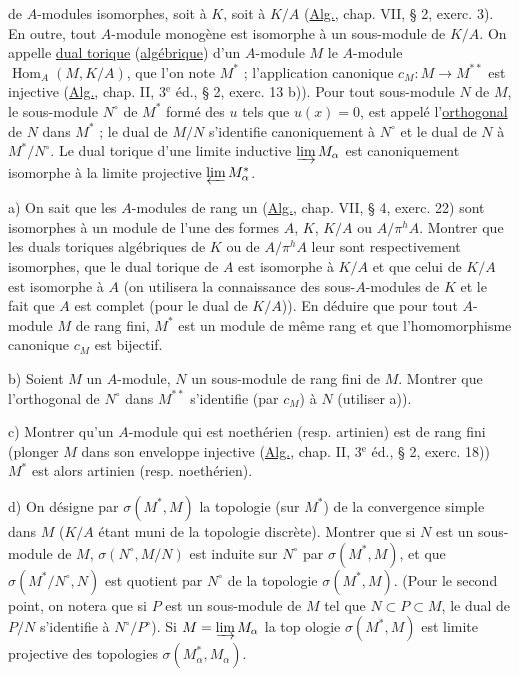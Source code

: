 de $A$-modules isomorphes, soit à $K$, soit à $K/A$ (\uline{Alg.}, chap. VII, § 2, exerc. 3). En outre, tout $A$-module monogène est isomorphe à un sous-module de $K/A$. On appelle \uline{dual torique} (\uline{algébrique}) d'un $A$-module $M$ le $A$-module $\operatorname{Hom}_A(M,K/A)$, que l'on note $M^*$ ; l'application canonique $c_M:M\longrightarrow M^{**}$ est injective (\uline{Alg.}, chap. II, 3$^{\mathrm e}$ éd., § 2, exerc. 13 b)). Pour tout sous-module $N$ de $M$, le sous-module $N^\circ$ de $M^*$ formé des $u$ tels que $u(x)=0$, est appelé l'\uline{orthogonal} de $N$ dans $M^*$ ; le dual de $M/N$ s'identifie canoniquement à $N^\circ$ et le dual de $N$ à $M^*/N^\circ$. Le dual torique d'une limite inductive $\varinjlim M_\alpha$ est canoniquement isomorphe à la limite projective $\varprojlim M_\alpha^*$.

a) On sait que les $A$-modules de rang un (\uline{Alg.}, chap. VII, § 4, exerc. 22) sont isomorphes à un module de l'une des formes $A$, $K$, $K/A$ ou $A/\pi^h A$. Montrer que les duals toriques algébriques de $K$ ou de $A/\pi^h A$ leur sont respectivement isomorphes, que le dual torique de $A$ est isomorphe à $K/A$ et que celui de $K/A$ est isomorphe à $A$ (on utilisera la connaissance des sous-$A$-modules de $K$ et le fait que $A$ est complet (pour le dual de $K/A$)). En déduire que pour tout $A$-module $M$ de rang fini, $M^*$ est un module de même rang et que l'homomorphisme canonique $c_M$ est bijectif.

b) Soient $M$ un $A$-module, $N$ un sous-module de rang fini de $M$. Montrer que l'orthogonal de $N^\circ$ dans $M^{**}$ s'identifie (par $c_M$) à $N$ (utiliser a)).

c) Montrer qu'un $A$-module qui est noethérien (resp. artinien) est de rang fini (plonger $M$ dans son enveloppe injective (\uline{Alg.}, chap. II, 3$^{\mathrm e}$ éd., § 2, exerc. 18)) $M^*$ est alors artinien (resp. noethérien).

d) On désigne par $\sigma(M^*,M)$ la topologie (sur $M^*$) de la convergence simple dans $M$ ($K/A$ étant muni de la topologie discrète). Montrer que si $N$ est un sous-module de $M$, $\sigma(N^\circ,M/N)$ est induite sur $N^\circ$ par $\sigma(M^*,M)$, et que $\sigma(M^*/N^\circ,N)$ est quotient par $N^\circ$ de la topologie $\sigma(M^*,M)$. (Pour le second point, on notera que si $P$ est un sous-module de $M$ tel que $N\subset P\subset M$, le dual de $P/N$ s'identifie à $N^\circ/P^\circ$). Si $M=\varinjlim M_\alpha$ la top ologie $\sigma(M^*,M)$ est limite projective des topologies $\sigma(M_\alpha^*,M_\alpha)$.

